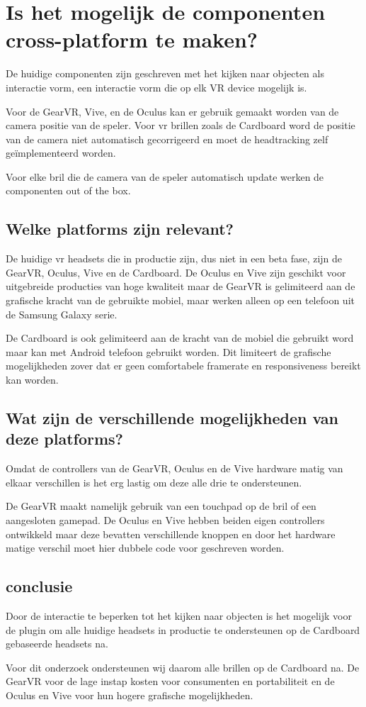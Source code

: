 \section{Is het mogelijk de componenten cross-platform te maken?}
De huidige componenten zijn geschreven met het kijken naar objecten als interactie vorm, een interactie vorm die op elk VR device mogelijk is. 

Voor de GearVR, Vive, en de Oculus kan er gebruik gemaakt worden van de camera positie van de speler. Voor \gls{vr} brillen zoals de Cardboard word de positie van de camera niet automatisch gecorrigeerd en moet de headtracking zelf geïmplementeerd worden. 

Voor elke bril die de camera van de speler automatisch update werken de componenten out of the box.

\subsection{Welke platforms zijn relevant?}
\label{subsec:platforms}
De huidige \gls{vr} headsets die in productie zijn, dus niet in een beta fase, zijn de GearVR, Oculus, Vive en de Cardboard. De Oculus en Vive zijn geschikt voor uitgebreide producties van hoge kwaliteit maar de GearVR is gelimiteerd aan de grafische kracht van de gebruikte mobiel, maar werken alleen op een telefoon uit de Samsung Galaxy serie. 

De Cardboard is ook gelimiteerd aan de kracht van de mobiel die gebruikt word maar kan met Android telefoon gebruikt worden. Dit limiteert de grafische mogelijkheden zover dat er geen comfortabele framerate en responsiveness bereikt kan worden.

\subsection{Wat zijn de verschillende mogelijkheden van deze platforms?}
Omdat de controllers van de GearVR, Oculus en de Vive hardware matig van elkaar verschillen is het erg lastig om deze alle drie te ondersteunen. 

De GearVR maakt namelijk gebruik van een touchpad op de bril of een aangesloten gamepad. De Oculus en Vive hebben beiden eigen controllers ontwikkeld maar deze bevatten verschillende knoppen en door het hardware matige verschil moet hier dubbele code voor geschreven worden.

\subsection{conclusie}
Door de interactie te beperken tot het kijken naar objecten is het mogelijk voor de plugin om alle huidige headsets in productie te ondersteunen op de Cardboard gebaseerde headsets na.

Voor dit onderzoek ondersteunen wij daarom alle brillen op de Cardboard na. De GearVR voor de lage instap kosten voor consumenten en portabiliteit en de Oculus en Vive voor hun hogere grafische mogelijkheden.